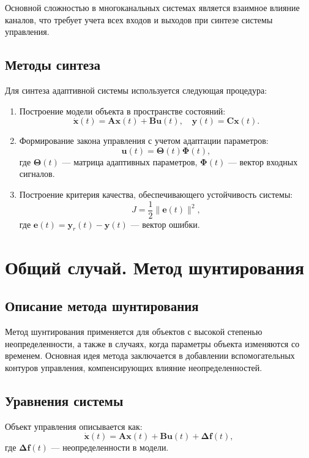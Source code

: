 \documentclass[a4paper,14pt]{extarticle} %
\begin{document}
Основной сложностью в многоканальных системах является взаимное влияние каналов, что требует учета всех входов и выходов при синтезе системы управления.

\subsection*{Методы синтеза}
Для синтеза адаптивной системы используется следующая процедура:
\begin{enumerate}
    \item Построение модели объекта в пространстве состояний:
    \begin{equation}
    \dot{\mathbf{x}}(t) = \mathbf{A}\mathbf{x}(t) + \mathbf{B}\mathbf{u}(t),
    \quad \mathbf{y}(t) = \mathbf{C}\mathbf{x}(t).
    \end{equation}
    \item Формирование закона управления с учетом адаптации параметров:
    \begin{equation}
    \mathbf{u}(t) = \mathbf{\Theta}(t)\mathbf{\Phi}(t),
    \end{equation}
    где $\mathbf{\Theta}(t)$ — матрица адаптивных параметров, $\mathbf{\Phi}(t)$ — вектор входных сигналов.
    \item Построение критерия качества, обеспечивающего устойчивость системы:
    \begin{equation}
    J = \frac{1}{2} \|\mathbf{e}(t)\|^2,
    \end{equation}
    где $\mathbf{e}(t) = \mathbf{y}_r(t) - \mathbf{y}(t)$ — вектор ошибки.
\end{enumerate}

\section{Общий случай. Метод шунтирования}
\subsection*{Описание метода шунтирования}
Метод шунтирования применяется для объектов с высокой степенью неопределенности, а также в случаях, когда параметры объекта изменяются со временем. Основная идея метода заключается в добавлении вспомогательных контуров управления, компенсирующих влияние неопределенностей.

\subsection*{Уравнения системы}
Объект управления описывается как:
\begin{equation}
\dot{\mathbf{x}}(t) = \mathbf{A}\mathbf{x}(t) + \mathbf{B}\mathbf{u}(t) + \mathbf{\Delta f}(t),
\end{equation}
где $\mathbf{\Delta f}(t)$ — неопределенности в модели.
\end{document}
